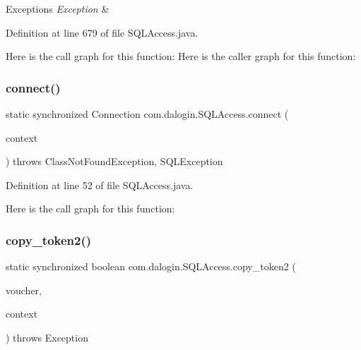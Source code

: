 \begin{DoxyExceptions}{Exceptions}
{\em Exception} & \\
\hline
\end{DoxyExceptions}


Definition at line 679 of file S\+Q\+L\+Access.\+java.

Here is the call graph for this function\+:
Here is the caller graph for this function\+:
\mbox{\label{classcom_1_1dalogin_1_1_s_q_l_access_aaf49ea97dbc3ae15a9db020070c6c915}} 
\subsubsection{\texorpdfstring{connect()}{connect()}}
{\footnotesize\ttfamily static synchronized Connection com.\+dalogin.\+S\+Q\+L\+Access.\+connect (\begin{DoxyParamCaption}\item[{Servlet\+Context}]{context }\end{DoxyParamCaption}) throws Class\+Not\+Found\+Exception, S\+Q\+L\+Exception\hspace{0.3cm}{\ttfamily [static]}}



Definition at line 52 of file S\+Q\+L\+Access.\+java.

Here is the call graph for this function\+:
\mbox{\label{classcom_1_1dalogin_1_1_s_q_l_access_ae784394432104d42f855a9ee1e8be8ee}} 
\subsubsection{\texorpdfstring{copy\+\_\+token2()}{copy\_token2()}}
{\footnotesize\ttfamily static synchronized boolean com.\+dalogin.\+S\+Q\+L\+Access.\+copy\+\_\+token2 (\begin{DoxyParamCaption}\item[{String}]{voucher,  }\item[{Servlet\+Context}]{context }\end{DoxyParamCaption}) throws Exception\hspace{0.3cm}{\ttfamily [static]}}

